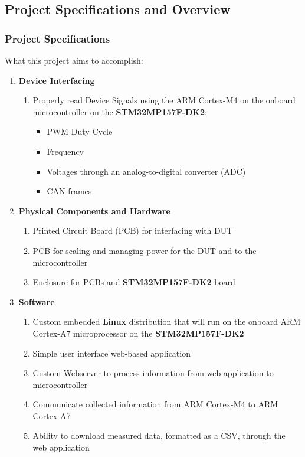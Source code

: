 \documentclass[8pt,compress]{beamer}
\begin{document}
\subsection{Project Specifications and Overview}
\begin{frame}
  \frametitle{Project Specifications}
  \small
  \begin{block}{What this project aims to accomplish:}
    \begin{enumerate}[label*=\arabic*]
      \item {\color{RoyalBlue}\textbf{Device Interfacing}}
        \begin{enumerate}[label*=.\arabic*]
          \item Properly read Device Signals using the ARM Cortex-M4 on the onboard microcontroller on the 
            \textbf{STM32MP157F-DK2}:
            \begin{itemize}
              \item PWM Duty Cycle 
              \item Frequency
              \item Voltages through an analog-to-digital converter (ADC)
              \item CAN frames
            \end{itemize}
        \end{enumerate}
      \item {\color{RoyalBlue}\textbf{Physical Components and Hardware}}
        \begin{enumerate}[label*=.\arabic*]
          \item Printed Circuit Board (PCB) for interfacing with DUT
          \item PCB for scaling and managing power for the DUT and to the microcontroller
          \item Enclosure for PCBs and \textbf{STM32MP157F-DK2} board
        \end{enumerate}
      \item {\color{RoyalBlue}\textbf{Software}}
        \begin{enumerate}[label*=.\arabic*]
          \item Custom embedded \textbf{Linux} distribution that will run on the onboard ARM Cortex-A7
            microprocessor on the \textbf{STM32MP157F-DK2}
          \item Simple user interface web-based application
          \item Custom Webserver to process information from web application to microcontroller
          \item Communicate collected information from ARM Cortex-M4 to ARM Cortex-A7
          \item Ability to download measured data, formatted as a CSV, through the web application 
        \end{enumerate}
    \end{enumerate}
  \end{block}
\end{frame}
\end{document}
